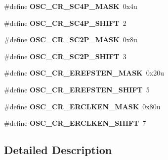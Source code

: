 \begin{DoxyCompactItemize}
\item 
\#define {\bfseries O\+S\+C\+\_\+\+C\+R\+\_\+\+S\+C4\+P\+\_\+\+M\+A\+SK}~0x4u\hypertarget{group__OSC__Register__Masks_ga18f4104a5a6c0d94f0592ee06732fe03}{}\label{group__OSC__Register__Masks_ga18f4104a5a6c0d94f0592ee06732fe03}

\item 
\#define {\bfseries O\+S\+C\+\_\+\+C\+R\+\_\+\+S\+C4\+P\+\_\+\+S\+H\+I\+FT}~2\hypertarget{group__OSC__Register__Masks_gab1724a5b1e96efb22e48a9478ae8cf25}{}\label{group__OSC__Register__Masks_gab1724a5b1e96efb22e48a9478ae8cf25}

\item 
\#define {\bfseries O\+S\+C\+\_\+\+C\+R\+\_\+\+S\+C2\+P\+\_\+\+M\+A\+SK}~0x8u\hypertarget{group__OSC__Register__Masks_ga94a8b0e48d18793bde1a3aaaea44b92c}{}\label{group__OSC__Register__Masks_ga94a8b0e48d18793bde1a3aaaea44b92c}

\item 
\#define {\bfseries O\+S\+C\+\_\+\+C\+R\+\_\+\+S\+C2\+P\+\_\+\+S\+H\+I\+FT}~3\hypertarget{group__OSC__Register__Masks_ga0ec9adaf1ca3ec309f1a2c2fd37d3f4d}{}\label{group__OSC__Register__Masks_ga0ec9adaf1ca3ec309f1a2c2fd37d3f4d}

\item 
\#define {\bfseries O\+S\+C\+\_\+\+C\+R\+\_\+\+E\+R\+E\+F\+S\+T\+E\+N\+\_\+\+M\+A\+SK}~0x20u\hypertarget{group__OSC__Register__Masks_ga3024913f44011d333c6f48ddb00fbf9d}{}\label{group__OSC__Register__Masks_ga3024913f44011d333c6f48ddb00fbf9d}

\item 
\#define {\bfseries O\+S\+C\+\_\+\+C\+R\+\_\+\+E\+R\+E\+F\+S\+T\+E\+N\+\_\+\+S\+H\+I\+FT}~5\hypertarget{group__OSC__Register__Masks_gac1b9c5d7f156f1792255204dae816aba}{}\label{group__OSC__Register__Masks_gac1b9c5d7f156f1792255204dae816aba}

\item 
\#define {\bfseries O\+S\+C\+\_\+\+C\+R\+\_\+\+E\+R\+C\+L\+K\+E\+N\+\_\+\+M\+A\+SK}~0x80u\hypertarget{group__OSC__Register__Masks_gab96140627de270278cbdfc81fbef63fc}{}\label{group__OSC__Register__Masks_gab96140627de270278cbdfc81fbef63fc}

\item 
\#define {\bfseries O\+S\+C\+\_\+\+C\+R\+\_\+\+E\+R\+C\+L\+K\+E\+N\+\_\+\+S\+H\+I\+FT}~7\hypertarget{group__OSC__Register__Masks_ga56f4aa6f215268327accda5434671187}{}\label{group__OSC__Register__Masks_ga56f4aa6f215268327accda5434671187}

\end{DoxyCompactItemize}


\subsection{Detailed Description}
